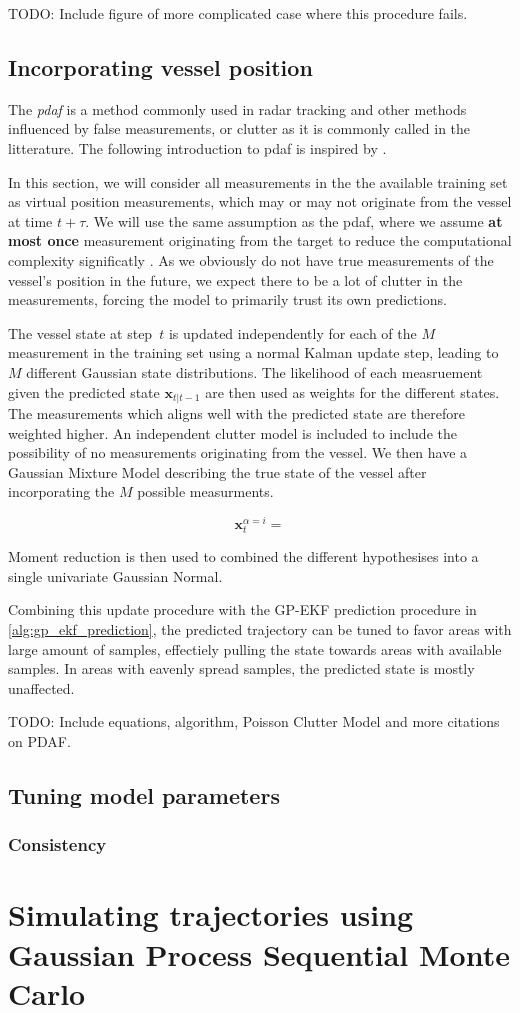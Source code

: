 TODO: Include figure of more complicated case where this procedure fails.

\subsection{Incorporating vessel position}
The \textit{\acrfull{pdaf}} is a method commonly used in radar tracking and other methods influenced by false measurements, or clutter as it is commonly called in the litterature. The following introduction to \acrshort{pdaf} is inspired by \cite{sensorfusjon}.

In this section, we will consider all measurements in the the available training set as virtual position measurements, which may or may not originate from the vessel at time $t + \tau$. We will use the same assumption as the \acrshort{pdaf}, where we assume \textbf{at most once} measurement originating from the target to reduce the computational complexity significatly \cite{sensorfusjon}. As we obviously do not have true measurements of the vessel's position in the future, we expect there to be a lot of clutter in the measurements, forcing the model to primarily trust its own predictions. 

The vessel state at step $t$ is updated independently for each of the $M$ measurement in the training set using a normal Kalman update step, leading to $M$ different Gaussian state distributions. The likelihood of each measruement given the predicted state $\boldsymbol{x}_{t | t-1}$ are then used as weights for the different states. The measurements which aligns well with the predicted state are therefore weighted higher. An independent clutter model is included to include the possibility of no measurements originating from the vessel. We then have a Gaussian Mixture Model describing the true state of the vessel after incorporating the $M$ possible measurments.

\begin{equation}
    \boldsymbol{x}_t^{\alpha=i} = \text{}
\end{equation}

Moment reduction is then used to combined the different hypothesises into a single univariate Gaussian Normal.

Combining this update procedure with the GP-EKF prediction procedure in \cref{alg:gp_ekf_prediction}, the predicted trajectory can be tuned to favor areas with large amount of samples, effectiely pulling the state towards areas with available samples. In areas with eavenly spread samples, the predicted state is mostly unaffected.

TODO: Include equations, algorithm, Poisson Clutter Model and more citations on PDAF. 

\subsection{Tuning model parameters}
\subsubsection{Consistency}


\section{Simulating trajectories using Gaussian Process Sequential Monte Carlo}